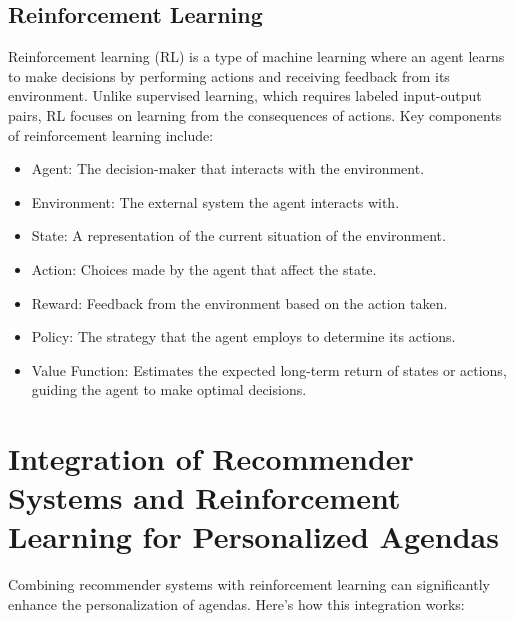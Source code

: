 \documentclass[10pt,twocolumn,letterpaper]{article}
\begin{document}
\subsection{Reinforcement Learning}
Reinforcement learning (RL) is a type of machine learning where an agent learns to make decisions by performing actions and receiving feedback from its environment. Unlike supervised learning, which requires labeled input-output pairs, RL focuses on learning from the consequences of actions. Key components of reinforcement learning include: 
    
\begin{itemize}

    \item Agent: The decision-maker that interacts with the environment.
    
    \item Environment: The external system the agent interacts with.
    
    \item State: A representation of the current situation of the environment.
    
    \item Action: Choices made by the agent that affect the state.
    
    \item Reward: Feedback from the environment based on the action taken.

    \item Policy: The strategy that the agent employs to determine its actions.

    \item Value Function: Estimates the expected long-term return of states or actions, guiding the agent to make optimal decisions.
        
\end{itemize}



\section{Integration of Recommender Systems and Reinforcement Learning for Personalized Agendas}
Combining recommender systems with reinforcement learning can significantly enhance the personalization of agendas. Here’s how this integration works\cite{RLRS}:
\end{document}
